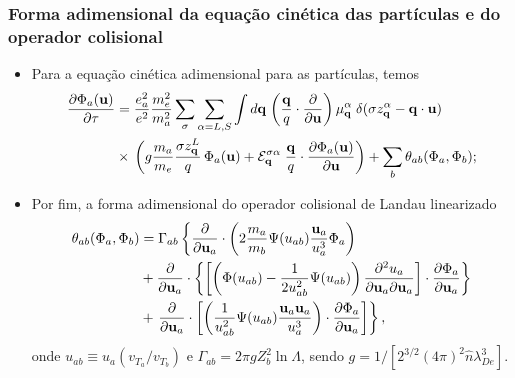 \documentclass[10pt,aspectratio=1610,lualatex]{beamer}
\begin{document}
\begin{frame}
  \frametitle{Forma adimensional da equação cinética das partículas
    e do operador colisional}
  \begin{itemize}
    \item Para a equação cinética adimensional para as partículas, temos
    \begin{equation*}
      \begin{split}
	\frac{\partial \Phi_a({\bf u})}{\partial \tau}
	&=\frac{e_a^2}{e^2}\frac{m_e^2}{m_a^2}
	\sum_\sigma\sum_{\alpha=L,S}\int d{\bf q}\;\biggl(
	\frac{\bf q}{q} \cdot\frac{\partial}{\partial{\bf u}}
	\biggr)\,\mu_{\bf q}^\alpha\;\delta(\sigma z_{\bf q}^\alpha
	-{\bf q}\cdot{\bf u})\\
	&\times\,\biggl(g\frac{m_a}{m_e}\frac{\sigma z_{\bf q}^L}{q}\,
	\Phi_a({\bf u})+{\cal E}_{\bf q}^{\sigma\alpha}\;\frac{\bf q}{q}
	\cdot\frac{\partial \Phi_a({\bf u})}{\partial{\bf u}}\biggr)
	+\sum_b\theta_{ab}(\Phi_a,\Phi_b);
      \end{split}
    \end{equation*}\vspace{-0.4cm}
    \pause
    \item Por fim, a forma adimensional do operador colisional de Landau
    linearizado
    \begin{equation*}
      \begin{split}
	\theta_{ab}(\Phi_a,\Phi_b) &= \Gamma_{ab}\left\{
	  \frac{\partial}{\partial{\bf u}_a}\cdot
	  \left(2\frac{m_a}{m_b}\Psi(u_{ab})
	    \frac{{\bf u}_a}{u^3_a}\Phi_a\right)\right.\\
	&+\frac{\partial}{\partial{\bf u}_a}\cdot
	 \left\{\left[\left(\Phi(u_{ab})
	      -\frac{1}{2 u_{ab}^2}\Psi(u_{ab})\right)
	    \frac{\partial^2u_a}{\partial{\bf u}_a
	      \partial{\bf u}_a}\right]\cdot
	  \frac{\partial \Phi_a}{\partial{\bf u}_a}\right\}\\
	&+\left. \frac{\partial}{\partial{\bf u}_a}\cdot
        \left[\left(\frac{1}{u_{ab}^2}\Psi(u_{ab})
	      \frac{{\bf u}_a{\bf u}_a}{u_a^3}\right)\cdot
	    \frac{\partial \Phi_a}{\partial{\bf u}_a}\right]\right\},
      \end{split}
    \end{equation*}
    onde  $u_{ab}\equiv u_a (v_{T_a}/v_{T_b})$ e
    $\Gamma_{ab}=2\pi g Z_b^2 \ln\Lambda $, sendo
    $g=1/[2^{3/2}(4\pi)^2\hat n \lambda_{De}^3]$.
  \end{itemize}
\end{frame}
\end{document}
